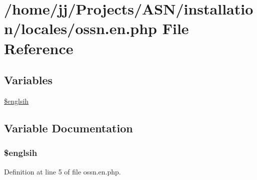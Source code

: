 \hypertarget{installation_2locales_2ossn_8en_8php}{}\section{/home/jj/\+Projects/\+A\+S\+N/installation/locales/ossn.en.\+php File Reference}
\label{installation_2locales_2ossn_8en_8php}
\subsection*{Variables}
\begin{DoxyCompactItemize}
\item 
\hyperlink{installation_2locales_2ossn_8en_8php_aa826b9e7f449cc145c2464ac0f647831}{\$englsih}
\end{DoxyCompactItemize}


\subsection{Variable Documentation}
\subsubsection[{\texorpdfstring{\$englsih}{$englsih}}]{\setlength{\rightskip}{0pt plus 5cm}\$englsih}\hypertarget{installation_2locales_2ossn_8en_8php_aa826b9e7f449cc145c2464ac0f647831}{}\label{installation_2locales_2ossn_8en_8php_aa826b9e7f449cc145c2464ac0f647831}


Definition at line 5 of file ossn.\+en.\+php.

